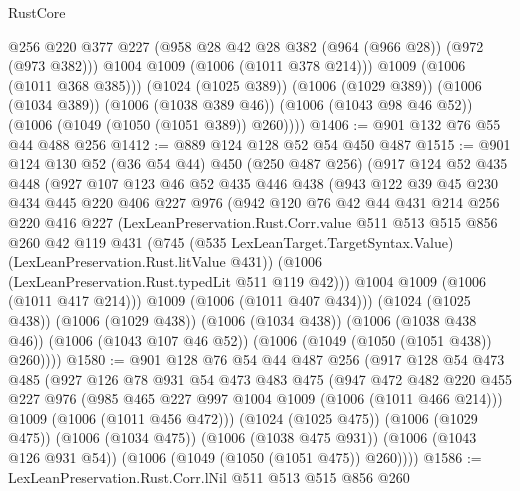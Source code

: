 \begin{lexlean}{RustCore}
\begin{coremodule}
            @256
            @220
            @377
            @227
            (@958 @28 @42 @28 @382 (@964 (@966 @28)) (@972 (@973 @382)))
            @1004
            @1009
            (@1006 (@1011 @378 @214)))
          @1009
          (@1006 (@1011 @368 @385)))
        (@1024 (@1025 @389))
        (@1006 (@1029 @389))
        (@1006 (@1034 @389))
        (@1006 (@1038 @389 @46))
        (@1006 (@1043 @98 @46 @52))
        (@1006 (@1049 (@1050 (@1051 @389)) @260))))
@1406 := @901 @132 @76 @55 @44 @488 @256
@1412 := @889 @124 @128 @52 @54 @450 @487
@1515 := @901
    @124
    @130
    @52
    (@36 @54 @44)
    @450
    (@250 @487 @256)
    (@917
      @124
      @52
      @435
      @448
      (@927
        @107
        @123
        @46
        @52
        @435
        @446
        @438
        (@943
          @122
          @39
          @45
          @230
          @434
          @445
          @220
          @406
          @227
          @976
          (@942
            @120
            @76
            @42
            @44
            @431
            @214
            @256
            @220
            @416
            @227
            (LexLeanPreservation.Rust.Corr.value
              @511
              @513
              @515
              @856
              @260
              @42
              @119
              @431
              (@745
                (@535 LexLeanTarget.TargetSyntax.Value)
                (LexLeanPreservation.Rust.litValue @431))
              (@1006 (LexLeanPreservation.Rust.typedLit @511 @119 @42)))
            @1004
            @1009
            (@1006 (@1011 @417 @214)))
          @1009
          (@1006 (@1011 @407 @434)))
        (@1024 (@1025 @438))
        (@1006 (@1029 @438))
        (@1006 (@1034 @438))
        (@1006 (@1038 @438 @46))
        (@1006 (@1043 @107 @46 @52))
        (@1006 (@1049 (@1050 (@1051 @438)) @260))))
@1580 := @901
    @128
    @76
    @54
    @44
    @487
    @256
    (@917
      @128
      @54
      @473
      @485
      (@927
        @126
        @78
        @931
        @54
        @473
        @483
        @475
        (@947
          @472
          @482
          @220
          @455
          @227
          @976
          (@985 @465 @227 @997 @1004 @1009 (@1006 (@1011 @466 @214)))
          @1009
          (@1006 (@1011 @456 @472)))
        (@1024 (@1025 @475))
        (@1006 (@1029 @475))
        (@1006 (@1034 @475))
        (@1006 (@1038 @475 @931))
        (@1006 (@1043 @126 @931 @54))
        (@1006 (@1049 (@1050 (@1051 @475)) @260))))
@1586 := LexLeanPreservation.Rust.Corr.lNil @511 @513 @515 @856 @260

\end{coremodule}
\end{lexlean}
